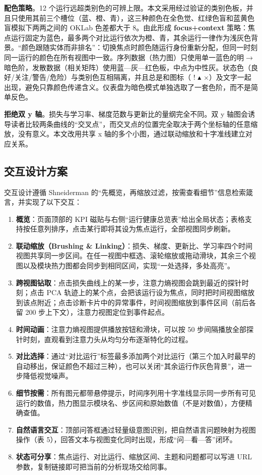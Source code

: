 \textbf{配色策略}。12 个运行远超类别色的可辨上限。本文采用经过验证的类别色板，并且只使用其前三个槽位（蓝、橙、青），这三种颜色在全色觉、红绿色盲和蓝黄色盲模拟下两两之间的 OKLab 色差都大于 8。由此形成 \textbf{focus+context} 策略：焦点运行固定为蓝色，最多两个对比运行依次为橙、青，其余运行一律作为浅灰色背景。“颜色跟随实体而非排名”：切换焦点时颜色随运行身份重新分配，但同一时刻同一运行的颜色在所有视图中一致。序列数据（热力图）只使用单一蓝色的明$\rightarrow$暗色阶，发散数据（相关矩阵）使用蓝—灰—红色板，中点为中性灰。状态色（良好/关注/警告/危险）与类别色互相隔离，并且总是和图标（\checkmark{} ! $\blacktriangle$ $\times$）及文字一起出现，避免只靠颜色传递含义。仪表盘为暗色模式单独选取了一套色阶，而不是简单反色。

\textbf{拒绝双 y 轴}。损失与学习率、梯度范数与更新比的量纲完全不同。双 y 轴图会诱导读者比较两条曲线的“交叉点”，而交叉点的位置完全取决于两个坐标轴的任意缩放，没有意义。本文改用共享 x 轴的多个小图，通过联动缩放和十字准线建立对应关系。

\subsection{交互设计方案}

交互设计遵循 Shneiderman 的“先概览，再缩放过滤，按需查看细节”信息检索箴言\cite{r15}，并实现了以下交互：

\begin{enumerate}
\item \textbf{概览}：页面顶部的 KPI 磁贴与右侧“运行健康总览表”给出全局状态；表格支持按任意列排序，点击某行即将其设为焦点运行，全部视图同步刷新。
\item \textbf{联动缩放（Brushing \& Linking）}：损失、梯度、更新比、学习率四个时间视图共享同一步区间。在任一视图中框选、滚轮缩放或拖动滑块，其余三个视图以及模块热力图都会同步到相同区间，实现“一处选择，多处高亮”。
\item \textbf{跨视图钻取}：点击损失曲线上的某一步，注意力熵视图会跳到最近的探针时刻；点击 PCA 轨迹上的某个点，会把该运行设为焦点，同时把时间视图缩放到该点附近；点击诊断卡片中的异常事件，时间视图缩放到事件区间（前后各留 200 步上下文），注意力视图定位到事件起点。
\item \textbf{时间动画}：注意力熵视图提供播放按钮和滑块，可以按 50 步间隔播放全部探针时刻，直观看到注意力头从均匀分布逐渐特化的过程。
\item \textbf{对比选择}：通过“对比运行”标签最多添加两个对比运行（第三个加入时最早的自动移出，保证颜色不超过三种），也可以关闭“其余运行作灰色背景”，进一步降低视觉噪声。
\item \textbf{细节按需}：所有图元都带悬停提示，时间序列用十字准线显示同一步所有可见运行的数值，热力图显示模块名、步区间和原始数值（不是对数值），方便精确查值。
\item \textbf{自然语言交互}：顶部问答框通过轻量级意图识别，把自然语言问题映射为视图操作（表 5），回答文本与视图变化同时出现，形成“问—看—答”闭环。
\item \textbf{状态可分享}：焦点运行、对比运行、缩放区间、主题和问题都可以写进 URL 参数，复制链接即可把当前的分析现场交给同事。
\end{enumerate}


